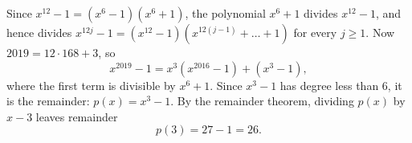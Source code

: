 Since $x^{12}-1=(x^6-1)(x^6+1)$, the polynomial $x^6+1$ divides $x^{12}-1$, and hence divides $x^{12j}-1=(x^{12}-1)\left(x^{12(j-1)}+\dots+1\right)$ for every $j\ge1$. Now $2019=12\cdot168+3$, so
\[
x^{2019}-1=x^3\left(x^{2016}-1\right)+\left(x^3-1\right),
\]
where the first term is divisible by $x^6+1$. Since $x^3-1$ has degree less than $6$, it is the remainder: $p(x)=x^3-1$. By the remainder theorem, dividing $p(x)$ by $x-3$ leaves remainder
\[
p(3)=27-1=\boxed{26}.
\]
